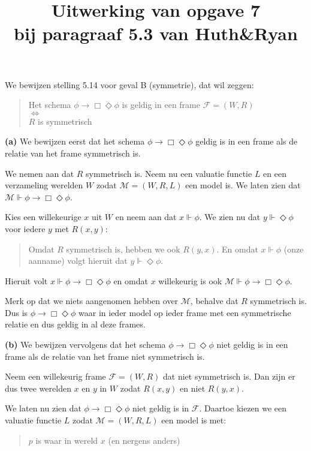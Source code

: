 \documentclass[a4paper,11pt]{article}
\title{Uitwerking van opgave 7\\
\normalsize{bij paragraaf 5.3 van Huth\&Ryan}}
\date{}
\begin{document}
\maketitle


We bewijzen stelling 5.14 voor geval B (symmetrie), dat wil zeggen:

\begin{quote}
  Het schema $\phi \rightarrow \Box \Diamond \phi$ is geldig in een frame
  $\mathcal{F} = (W, R)$ \\
  $\Longleftrightarrow$ \\
  $R$ is symmetrisch
\end{quote}


\begin{description}

\item{\bf (a)}
We bewijzen eerst dat het schema $\phi \rightarrow \Box \Diamond \phi$ geldig
is in een frame als de relatie van het frame symmetrisch is.

We nemen aan dat $R$ symmetrisch is. Neem nu een valuatie functie $L$ en een
verzameling werelden $W$ zodat $\mathcal{M} = (W, R, L)$ een model is. We
laten zien dat $\mathcal{M} \Vdash \phi \rightarrow \Box \Diamond \phi$.

Kies een willekeurige $x$ uit $W$ en neem aan dat $x \Vdash \phi$. We zien nu
dat $y \Vdash \Diamond \phi$ voor iedere $y$ met $R(x, y)$:
\begin{quote}
  Omdat $R$ symmetrisch is, hebben we ook $R(y, x)$. En omdat $x \Vdash \phi$
  (onze aanname) volgt hieruit dat $y \Vdash \Diamond \phi$.
\end{quote}
Hieruit volt $x \Vdash \phi \rightarrow \Box \Diamond \phi$ en omdat $x$
willekeurig is ook $\mathcal{M} \Vdash \phi \rightarrow \Box \Diamond \phi$.

Merk op dat we niets aangenomen hebben over $\mathcal{M}$, behalve dat $R$
symmetrisch is. Dus is $\phi \rightarrow \Box \Diamond \phi$ waar in ieder
model op ieder frame met een symmetrische relatie en dus geldig in al deze
frames.

\item{\bf (b)}
We bewijzen vervolgens dat het schema $\phi \rightarrow \Box \Diamond \phi$
niet geldig is in een frame als de relatie van het frame niet symmetrisch is.

Neem een willekeurig frame $\mathcal{F} = (W, R)$ dat niet symmetrisch is. Dan
zijn er dus twee werelden $x$ en $y$ in $W$ zodat $R(x, y)$ en niet $R(y, x)$.

We laten nu zien dat $\phi \rightarrow \Box \Diamond \phi$ niet geldig is in
$\mathcal{F}$. Daartoe kiezen we een valuatie functie $L$ zodat
$\mathcal{M} = (W, R, L)$ een model is met:
\begin{quote}
$p$ is waar in wereld $x$ (en nergens anders)
\end{quote}


\end{description}
\end{document}
